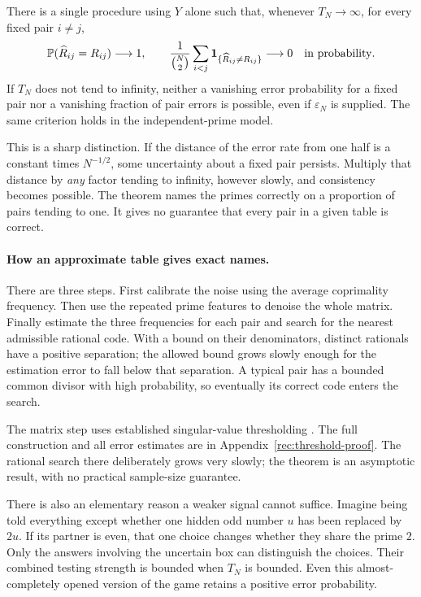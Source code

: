 \begin{theorem}\label{rec:threshold}
There is a single procedure using $Y$ alone such that, whenever
$T_N\to\infty$, for every fixed pair $i\ne j$,
\[
 \mathbb P(\widehat R_{ij}=R_{ij})\longrightarrow1,
 \qquad
 \frac1{\binom N2}\sum_{i<j}\mathbf1_{\{\widehat R_{ij}\ne R_{ij}\}}
 \longrightarrow0\quad\hbox{in probability}.
\]
If $T_N$ does not tend to infinity, neither a vanishing error probability
for a fixed pair nor a vanishing fraction of pair errors is possible,
even if $\varepsilon_N$ is supplied. The same criterion holds in the
independent-prime model.
\end{theorem}

This is a sharp distinction. If the distance of the error rate from one
half is a constant times $N^{-1/2}$, some uncertainty about a fixed
pair persists. Multiply that distance by \emph{any} factor tending to
infinity, however slowly, and consistency becomes possible. The theorem
names the primes correctly on a proportion of pairs tending to one.
It gives no guarantee that every pair in a given table is correct.

\paragraph{How an approximate table gives exact names.}
There are three steps. First calibrate the noise using the average
coprimality frequency. Then use the repeated prime features to denoise
the whole matrix. Finally estimate the three frequencies for each pair
and search for the nearest admissible rational code. With a bound on
their denominators, distinct rationals have a positive separation;
the allowed bound grows slowly enough for the estimation error to fall
below that separation. A typical pair has a bounded common divisor
with high probability, so eventually its correct code enters the search.

The matrix step uses established singular-value thresholding
\cite{RecChatterjeeUSVT2015,RecXuSpectral2018}. The full construction and
all error estimates are in Appendix~\ref{rec:threshold-proof}. The
rational search there deliberately grows very slowly; the theorem is
an asymptotic result, with no practical sample-size guarantee.

There is also an elementary reason a weaker signal cannot suffice.
Imagine being told everything except whether one hidden odd number
$u$ has been replaced by $2u$. If its partner is even, that one choice
changes whether they share the prime $2$. Only the answers involving
the uncertain box can distinguish the choices. Their combined testing
strength is bounded when $T_N$ is bounded. Even this almost-completely
opened version of the game retains a positive error probability.

